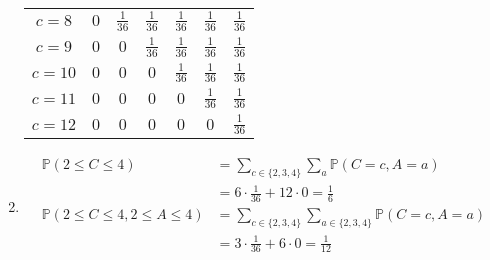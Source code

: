\begin{enumerate}[label=\alph*.]
\begin{tabular}{c|cccccc}
$c = 8$  & $0$ & $\frac{1}{36}$ & $\frac{1}{36}$ & $\frac{1}{36}$ & $\frac{1}{36}$ & $\frac{1}{36}$ \\
$c = 9$  & $0$ & $0$ & $\frac{1}{36}$ & $\frac{1}{36}$ & $\frac{1}{36}$ & $\frac{1}{36}$ \\
$c = 10$ & $0$ & $0$ & $0$ & $\frac{1}{36}$ & $\frac{1}{36}$ & $\frac{1}{36}$ \\
$c = 11$ & $0$ & $0$ & $0$ & $0$ & $\frac{1}{36}$ & $\frac{1}{36}$ \\
$c = 12$ & $0$ & $0$ & $0$ & $0$ & $0$ & $\frac{1}{36}$ \\
\end{tabular}
\item
\begin{align*}
\mathbb{P}(2 \leq C \leq 4) &=
\sum_{c\in\{2, 3, 4\}} \sum_{a} \mathbb{P}(C=c, A=a) \\
&= 6 \cdot \frac{1}{36} + 12 \cdot 0 = \frac{1}{6} \\
\mathbb{P}(2 \leq C \leq 4, 2 \leq A \leq 4) &= \sum_{c\in\{2, 3, 4\}} \sum_{a \in \{ 2, 3, 4\}} \mathbb{P}(C=c, A=a) \\
&= 3 \cdot \frac{1}{36} + 6 \cdot 0 = \frac{1}{12} \\
\end{align*}
\end{enumerate}

\paragraph{}

